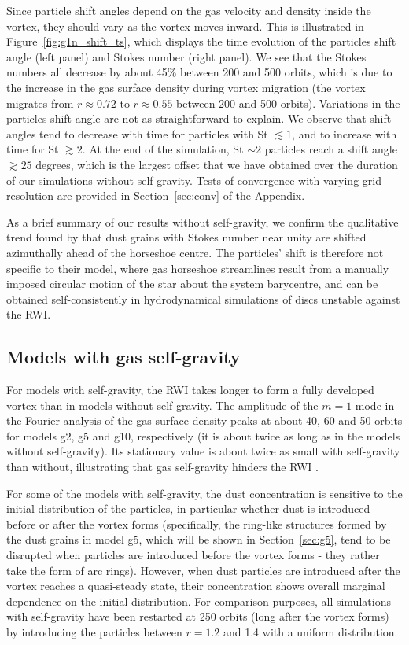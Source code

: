 \documentclass[a4paper,usenatbib]{mnras}
\begin{document}
Since particle shift angles depend on the gas velocity and density
inside the vortex, they should vary as the vortex moves inward. This
is illustrated in Figure~\ref{fig:g1n_shift_ts}, which displays the
time evolution of the particles shift angle (left panel) and Stokes
number (right panel). We see that the Stokes numbers all decrease by
about 45\% between 200 and 500 orbits, which is due to the increase in
the gas surface density during vortex migration (the vortex migrates
from $r \approx 0.72$ to $r \approx 0.55$ between 200 and 500 orbits).
Variations in the particles shift angle are not as straightforward to
explain. We observe that shift angles tend to decrease with time for
particles with St $\lesssim1$, and to increase with time for St
$\gtrsim 2$. At the end of the simulation, St $\sim 2$ particles reach
a shift angle $\gtrsim 25$ degrees, which is the largest offset that
we have obtained over the duration of our simulations without
self-gravity. Tests of convergence with varying grid resolution are
provided in Section~\ref{sec:conv} of the Appendix.

As a brief summary of our results without self-gravity, we confirm the
qualitative trend found by \cite{MC15} that dust grains with Stokes
number near unity are shifted azimuthally ahead of the horseshoe
centre. The particles' shift is therefore not specific to their model,
where gas horseshoe streamlines result from a manually imposed
circular motion of the star about the system barycentre, and can be
obtained self-consistently in hydrodynamical simulations of discs
unstable against the RWI.


\subsection{Models with gas self-gravity}
\label{sec:w}
For models with self-gravity, the RWI takes longer to form a fully
developed vortex than in models without self-gravity. The amplitude of
the $m=1$ mode in the Fourier analysis of the gas surface density
peaks at about 40, 60 and 50 orbits for models g2, g5 and g10,
respectively (it is about twice as long as in the models without
self-gravity). Its stationary value is about twice as small with
self-gravity than without, illustrating that gas self-gravity hinders
the RWI \citep{GN88}.

For some of the models with self-gravity, the dust concentration is
sensitive to the initial distribution of the particles, in particular
whether dust is introduced before or after the vortex forms
(specifically, the ring-like structures formed by the dust grains in
model g5, which will be shown in Section~\ref{sec:g5}, tend to be
disrupted when particles are introduced before the vortex forms - they
rather take the form of arc rings). However, when dust particles are
introduced after the vortex reaches a quasi-steady state, their
concentration shows overall marginal dependence on the initial
distribution. For comparison purposes, all simulations with
self-gravity have been restarted at 250 orbits (long after the vortex
forms) by introducing the particles between $r=1.2$ and 1.4 with a
uniform distribution.
\end{document}
